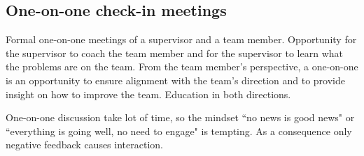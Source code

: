 \subsection*{One-on-one check-in meetings\label{sec:meetings-one-on-one}}


Formal one-on-one meetings of a supervisor and a team member. Opportunity for the supervisor to coach the team member and for the supervisor to learn what the problems are on the team. From the team member's perspective, a one-on-one is an opportunity to ensure alignment with the team's direction and to provide insight on how to improve the team. Education in both directions. 

One-on-one discussion take lot of time, so the mindset ``no news is good news" or ``everything is going well, no need to engage" is tempting. As a consequence only negative feedback causes interaction. 


